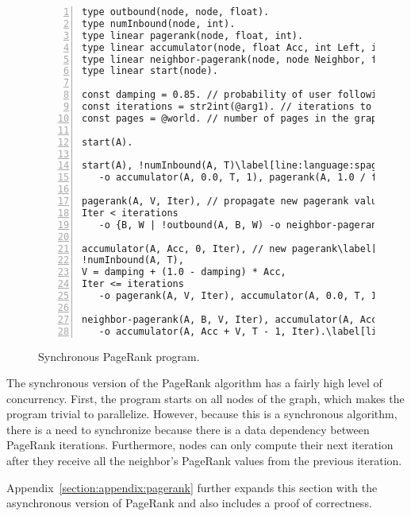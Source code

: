 \begin{figure}[h!]
\begin{Verbatim}[numbers=left,fontsize=\codesize,commandchars=\\\[\]]
type outbound(node, node, float).
type numInbound(node, int).
type linear pagerank(node, float, int).
type linear accumulator(node, float Acc, int Left, int Iteration).
type linear neighbor-pagerank(node, node Neighbor, float Rank, int Iteration).
type linear start(node).

const damping = 0.85. // probability of user following a link in the current page.\label[line:language:spagerank_const1]
const iterations = str2int(@arg1). // iterations to compute.
const pages = @world. // number of pages in the graph.\label[line:language:spagerank_const2]

start(A).

start(A), !numInbound(A, T)\label[line:language:spagerank_first1]
   -o accumulator(A, 0.0, T, 1), pagerank(A, 1.0 / float(pages), 0).\label[line:language:spagerank_first2]

pagerank(A, V, Iter), // propagate new pagerank value\label[line:language:spagerank_second1]
Iter < iterations
   -o {B, W | !outbound(A, B, W) -o neighbor-pagerank(B, A, V * W, Iter + 1)}.\label[line:language:spagerank_second2]

accumulator(A, Acc, 0, Iter), // new pagerank\label[line:language:spagerank_third1]
!numInbound(A, T),
V = damping + (1.0 - damping) * Acc,
Iter <= iterations
   -o pagerank(A, V, Iter), accumulator(A, 0.0, T, Iter + 1).\label[line:language:spagerank_third2]
	
neighbor-pagerank(A, B, V, Iter), accumulator(A, Acc, T, Iter)\label[line:language:spagerank_fourth1]
   -o accumulator(A, Acc + V, T - 1, Iter).\label[line:language:spagerank_fourth2]
\end{Verbatim}
\caption{Synchronous PageRank program.}
\label{language:code:pagerank}
\end{figure}

The synchronous version of the PageRank algorithm has a fairly high level of
concurrency. First, the program starts on all nodes of the graph, which makes
the program trivial to parallelize. However, because this is a synchronous
algorithm, there is a need to synchronize because there is a data dependency
between PageRank iterations. Furthermore, nodes can only compute their next
iteration after they receive all the neighbor's PageRank values from the
previous iteration.

Appendix~\ref{section:appendix:pagerank} further expands this section with the
asynchronous version of PageRank and also includes a proof of correctness.
